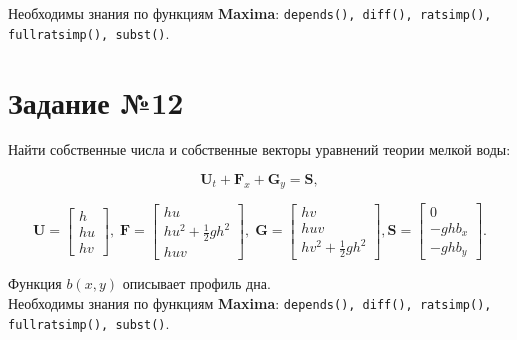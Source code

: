 	Необходимы знания по функциям \textbf{Maxima}: {\tt depends(), diff(), ratsimp(), fullratsimp(), subst()}.

\section*{Задание №12}

	Найти собственные числа и собственные векторы уравнений теории мелкой воды:
	
	\begin{equation}
		\mathbf{U}_{t} + \mathbf{F}_{x} + \mathbf{G}_{y} = \mathbf{S},
	\end{equation}

	\begin{equation}
		\mathbf{U} =
		\begin{bmatrix}
			h \\
			h u \\
			h v
		\end{bmatrix}, \;
		\mathbf{F} =
		\begin{bmatrix}
			h u \\
			h u^{2} + \frac{1}{2} g h^{2} \\
			h u v
		\end{bmatrix}, \;
		\mathbf{G} =
		\begin{bmatrix}
			h v \\
			h u v \\
			h v^{2} + \frac{1}{2} g h^{2}
		\end{bmatrix},
		\mathbf{S} =
		\begin{bmatrix}
			0 \\
			-g h b_{x} \\
			-g h b_{y}
		\end{bmatrix}.
	\end{equation}

	Функция $b \left( x, y \right)$ описывает профиль дна.\\

	Необходимы знания по функциям \textbf{Maxima}: {\tt depends(), diff(), ratsimp(), fullratsimp(), subst()}.

    \newpage
